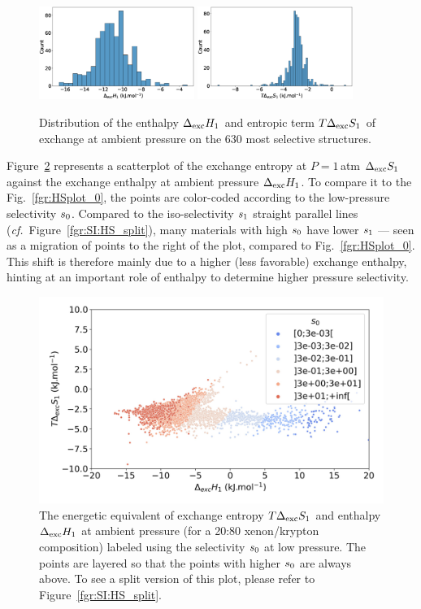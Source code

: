 \documentclass[main.tex]{subfiles}
\begin{document}
\begin{figure}[ht]
  \centering
    \includegraphics[width=0.45\textwidth]{figures/2-thermo/Delta_H_2080.jpg}
    \includegraphics[width=0.45\textwidth]{figures/2-thermo/T_Delta_S_2080.jpg}
    \caption{Distribution of the enthalpy $\Delta_{\text{exc}}H_{\text{1}}$ and entropic term $T\Delta_{\text{exc}}S_{\text{1}}$ of exchange at ambient pressure on the 630 most selective structures.}\label{fgr:SI:dist1}
\end{figure}

Figure~\ref{fgr:HSplot_1} represents a scatterplot of the exchange entropy at $P = 1$\,atm $\Delta_{\text{exc}}S_{\text{1}}$ against the exchange enthalpy at ambient pressure $\Delta_{\text{exc}}H_{\text{1}}$. To compare it to the Fig.~\ref{fgr:HSplot_0}, the points are color-coded according to the low-pressure selectivity $s_{\text{0}}$. Compared to the iso-selectivity $s_{\text{1}}$ straight parallel lines (\emph{cf.}~Figure~\ref{fgr:SI:HS_split}), many materials with high $s_{\text{0}}$ have lower $s_{\text{1}}$ --- seen as a migration of points to the right of the plot, compared to Fig.~\ref{fgr:HSplot_0}. This shift is therefore mainly due to a higher (less favorable) exchange enthalpy, hinting at an important role of enthalpy to determine higher pressure selectivity.

\begin{figure}[ht]
  \centering
    \includegraphics[width=0.6\linewidth]{figures/2-thermo/enthalpy_entropy_2080_s_0.jpg}
    \caption{The energetic equivalent of exchange entropy $T\Delta_{\text{exc}}S_{\text{1}}$ and enthalpy $\Delta_{\text{exc}}H_{\text{1}}$ at ambient pressure (for a 20:80 xenon/krypton composition) labeled using the selectivity $s_{\text{0}}$ at low pressure. The points are layered so that the points with higher $s_{\text{0}}$ are always above. To see a split version of this plot, please refer to Figure~\ref{fgr:SI:HS_split}.}\label{fgr:HSplot_1}
  \end{figure}
 
\end{document}
